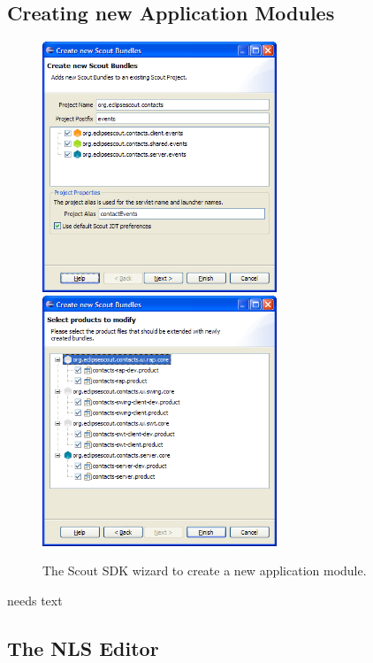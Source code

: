 \documentclass[a4paper,10pt,twoside]{book}
\begin{document}
\subsection{Creating new Application Modules}

\begin{figure}
\includegraphics[width=7cm]{wizard_new_bundles_1.png} \hspace{5mm}
\includegraphics[width=7cm]{wizard_new_bundles_2.png}
\caption{The Scout SDK wizard to create a new application module.}
\end{figure}

needs text

\subsection{The NLS Editor}
\end{document}
